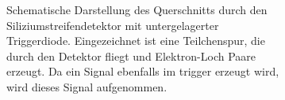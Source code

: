 \begin{figure}
\begin{subfigure}{0.45\textwidth}
    \caption{Schematische Darstellung des Querschnitts durch den Siliziumstreifendetektor mit untergelagerter Triggerdiode. Eingezeichnet ist eine Teilchenspur, die durch den Detektor fliegt und Elektron-Loch Paare erzeugt. Da ein Signal ebenfalls im trigger erzeugt wird, wird dieses Signal aufgenommen.}
    \label{fig:trigger}
  \end{subfigure}%
  \caption{}
\end{figure}


















%

